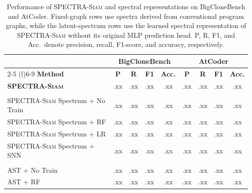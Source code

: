 \documentclass[final,5p,times,twocolumn]{elsarticle}
\newcommand{\method}{\textsc{SPECTRA-Siam}}
\theoremstyle{plain}
\begin{document}
\begin{table}[!htbp]
\centering
\caption{Performance of \method{} and spectral representations on BigCloneBench and AtCoder. Fixed-graph rows use spectra derived from conventional program graphs, while the latent-spectrum rows use the learned spectral representation of \method{} without its original MLP prediction head. P, R, F1, and Acc.\ denote precision, recall, F1-score, and accuracy, respectively.}
\label{tab:rq1}

\scriptsize
\setlength{\tabcolsep}{4.4pt}
\renewcommand{\arraystretch}{1.00}

\begin{tabular}{@{}lcccccccc@{}}
\toprule
& \multicolumn{4}{c}{\textbf{BigCloneBench}}
& \multicolumn{4}{c}{\textbf{AtCoder}} \\
\cmidrule(lr){2-5}
\cmidrule(l){6-9}
\textbf{Method}
& \textbf{P} & \textbf{R} & \textbf{F1} & \textbf{Acc.}
& \textbf{P} & \textbf{R} & \textbf{F1} & \textbf{Acc.} \\
\midrule

\textbf{\method{}}
& .xx & .xx & .xx & .xx
& .xx & .xx & .xx & .xx \\

\midrule

\rowcolor{black!7}
\multicolumn{9}{@{}l}{\textit{Learned latent spectral representation}} \\

\method{} Spectrum + No Train
& .xx & .xx & .xx & .xx
& .xx & .xx & .xx & .xx \\

\method{} Spectrum + RF
& .xx & .xx & .xx & .xx
& .xx & .xx & .xx & .xx \\

\method{} Spectrum + LR
& .xx & .xx & .xx & .xx
& .xx & .xx & .xx & .xx \\

\method{} Spectrum + SNN
& .xx & .xx & .xx & .xx
& .xx & .xx & .xx & .xx \\

\midrule

\rowcolor{black!7}
\multicolumn{9}{@{}l}{\textit{Fixed-graph spectral representations}} \\

AST + No Train
& .xx & .xx & .xx & .xx
& .xx & .xx & .xx & .xx \\

AST + RF
& .xx & .xx & .xx & .xx
& .xx & .xx & .xx & .xx \\


\end{tabular}
\end{table}
\end{document}
